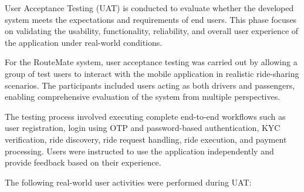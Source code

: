 \documentclass[10pt,a4paper]{report}
\begin{document}
\justify\large User Acceptance Testing (UAT) is conducted to evaluate whether the developed system meets the expectations and requirements of end users. This phase focuses on validating the usability, functionality, reliability, and overall user experience of the application under real-world conditions.

\justify\large For the RouteMate system, user acceptance testing was carried out by allowing a group of test users to interact with the mobile application in realistic ride-sharing scenarios. The participants included users acting as both drivers and passengers, enabling comprehensive evaluation of the system from multiple perspectives.

\justify\large The testing process involved executing complete end-to-end workflows such as user registration, login using OTP and password-based authentication, KYC verification, ride discovery, ride request handling, ride execution, and payment processing. Users were instructed to use the application independently and provide feedback based on their experience.

\justify\large The following real-world user activities were performed during UAT:
\end{document}
